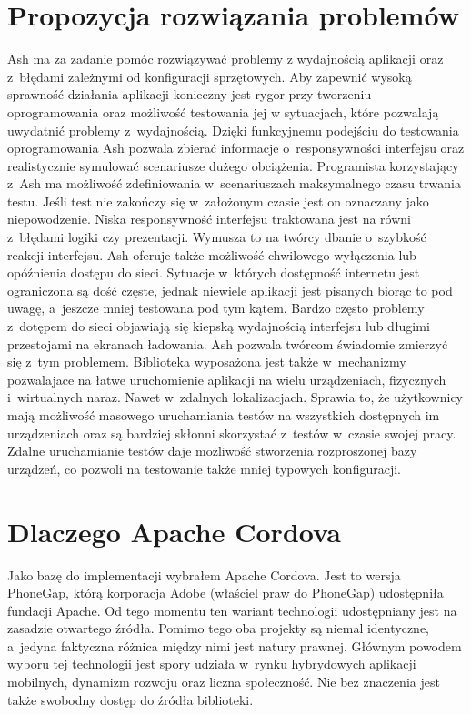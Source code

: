 \documentclass[brudnopis]{xmgr}
\begin{document}
\section{Propozycja rozwiązania problemów}
Ash ma za zadanie pomóc rozwiązywać problemy z wydajnością aplikacji oraz z~błędami zależnymi od konfiguracji sprzętowych. Aby
zapewnić wysoką sprawność działania aplikacji konieczny jest rygor przy tworzeniu
oprogramowania oraz możliwość testowania jej w sytuacjach, które pozwalają
uwydatnić problemy z~wydajnością. Dzięki funkcyjnemu podejściu do testowania
oprogramowania Ash pozwala zbierać informacje o~responsywności interfejsu
oraz realistycznie symulować scenariusze dużego obciążenia. Programista
korzystający z~Ash ma możliwość zdefiniowania w~scenariuszach maksymalnego
czasu trwania testu. Jeśli test nie zakończy się w~założonym czasie jest on oznaczany jako niepowodzenie. Niska responsywność interfejsu traktowana jest na równi z~błędami
logiki czy prezentacji. Wymusza to na twórcy dbanie o~szybkość reakcji interfejsu.
Ash oferuje także możliwość chwilowego wyłączenia lub opóźnienia dostępu do
sieci. Sytuacje w~których dostępność internetu jest ograniczona są dość częste,
jednak niewiele aplikacji jest pisanych biorąc to pod uwagę, a~jeszcze mniej 
testowana pod tym kątem. Bardzo często problemy z~dotępem do sieci objawiają się kiepską
wydajnością interfejsu lub długimi przestojami na ekranach ładowania. Ash pozwala
twórcom świadomie zmierzyć się z~tym problemem. Biblioteka wyposażona jest także w~mechanizmy pozwalajace na łatwe uruchomienie aplikacji na wielu urządzeniach, fizycznych i~wirtualnych naraz. Nawet w~zdalnych lokalizacjach. Sprawia to, że
użytkownicy mają możliwość masowego uruchamiania testów na wszystkich
dostępnych im urządzeniach oraz są bardziej skłonni skorzystać z~testów w~czasie
swojej pracy. Zdalne uruchamianie testów daje możliwość stworzenia
rozproszonej bazy urządzeń, co pozwoli na testowanie także mniej typowych
konfiguracji.

\section{Dlaczego Apache Cordova}
Jako bazę do implementacji wybrałem Apache Cordova. Jest to
wersja PhoneGap, którą korporacja Adobe (właściel praw do PhoneGap) udostępniła
fundacji Apache. Od tego momentu ten wariant technologii udostępniany jest
na zasadzie otwartego źródła. Pomimo tego oba projekty są niemal identyczne, a~jedyna faktyczna różnica między nimi jest natury prawnej. Głównym powodem
wyboru tej technologii jest spory udziała w~rynku hybrydowych aplikacji mobilnych,
dynamizm rozwoju oraz liczna społeczność. Nie bez znaczenia jest także swobodny dostęp do źródła biblioteki.
\end{document}

